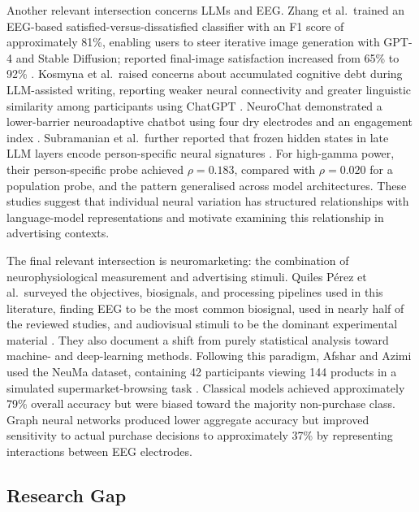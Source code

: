 \documentclass[english]{article}
\begin{document}
Another relevant intersection concerns LLMs and EEG. Zhang et al.\ trained an
EEG-based satisfied-versus-dissatisfied classifier with an F1 score of approximately
81\%, enabling users to steer iterative image generation with GPT-4 and Stable
Diffusion; reported final-image satisfaction increased from 65\% to 92\%
\cite{zhang2026eeg}. Kosmyna et al.\ raised concerns about accumulated cognitive
debt during LLM-assisted writing, reporting weaker neural connectivity and greater
linguistic similarity among participants using ChatGPT
\cite{kosmyna2025brainchatgpt}. NeuroChat demonstrated a lower-barrier
neuroadaptive chatbot using four dry electrodes and an engagement index
\cite{baradari2025neurochat}. Subramanian et al.\ further reported that frozen
hidden states in late LLM layers encode person-specific neural signatures
\cite{subramanian2026riding}. For high-gamma power, their person-specific probe
achieved $\rho=0.183$, compared with $\rho=0.020$ for a population probe, and the
pattern generalised across model architectures. These studies suggest that
individual neural variation has structured relationships with language-model
representations and motivate examining this relationship in advertising contexts.

The final relevant intersection is neuromarketing: the combination of
neurophysiological measurement and advertising stimuli. Quiles P\'erez et al.\
surveyed the objectives, biosignals, and processing pipelines used in this
literature, finding EEG to be the most common biosignal, used in nearly half of the
reviewed studies, and audiovisual stimuli to be the dominant experimental material
\cite{quilesperez2023neuromarketing}. They also document a shift from purely
statistical analysis toward machine- and deep-learning methods. Following this
paradigm, Afshar and Azimi used the NeuMa dataset, containing 42 participants
viewing 144 products in a simulated supermarket-browsing task
\cite{afshar2025eegconsumer}. Classical models achieved approximately 79\% overall
accuracy but were biased toward the majority non-purchase class. Graph neural
networks produced lower aggregate accuracy but improved sensitivity to actual
purchase decisions to approximately 37\% by representing interactions between EEG
electrodes.

\subsection{Research Gap}
\label{subsec:research-gap}
\end{document}
